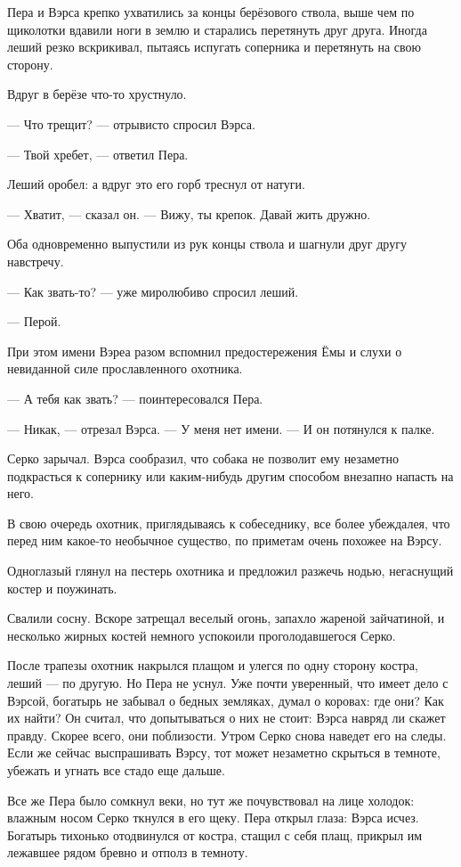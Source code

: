 \documentclass[oneside,final,14pt]{extreport}
\begin{document}
	Пера и Вэрса крепко ухватились за концы берёзового ствола, выше чем по щиколотки вдавили ноги в землю и старались перетянуть друг друга. Иногда леший резко вскрикивал, пытаясь испугать соперника и перетянуть на свою сторону.
	
	Вдруг в берёзе что-то хрустнуло.
	
	— Что трещит? — отрывисто спросил Вэрса.
	
	— Твой хребет, — ответил Пера.
	
	Леший оробел: а вдруг это его горб треснул от натуги.
	
	— Хватит, — сказал он. — Вижу, ты крепок. Давай жить дружно.
	
	Оба одновременно выпустили из рук концы ствола и шагнули друг другу навстречу.
	
	— Как звать-то? — уже миролюбиво спросил леший.
	
	— Перой.
	
	При этом имени Вэреа разом вспомнил предостережения Ёмы и слухи о невиданной силе прославленного охотника.
	
	— А тебя как звать? — поинтересовался Пера.
	
	— Никак, — отрезал Вэрса. — У меня нет имени. — И он потянулся к палке.
	
	Серко зарычал. Вэрса сообразил, что собака не позволит ему незаметно подкрасться к сопернику или каким-нибудь другим способом внезапно напасть на него.
	
	В свою очередь охотник, приглядываясь к собеседнику, все более убеждалея, что перед ним какое-то необычное существо, по приметам очень похожее на Вэрсу.
	
	Одноглазый глянул на пестерь охотника и предложил разжечь нодью, негаснущий костер и поужинать.
	
	Свалили сосну. Вскоре затрещал веселый огонь, запахло жареной зайчатиной, и несколько жирных костей немного успокоили проголодавшегося Серко.
	
	После трапезы охотник накрылся плащом и улегся по одну сторону костра, леший — по другую. Но Пера не уснул. Уже почти уверенный, что имеет дело с Вэрсой, богатырь не забывал о бедных земляках, думал о коровах: где они? Как их найти? Он считал, что допытываться о них не стоит: Вэрса навряд ли скажет правду. Скорее всего, они поблизости. Утром Серко снова наведет его на следы. Если же сейчас выспрашивать Вэрсу, тот может незаметно скрыться в темноте, убежать и угнать все стадо еще дальше.
	
	Все же Пера было сомкнул веки, но тут же почувствовал на лице холодок: влажным носом Серко ткнулся в его щеку. Пера открыл глаза: Вэрса исчез. Богатырь тихонько отодвинулся от костра, стащил с себя плащ, прикрыл им лежавшее рядом бревно и отполз в темноту.
	
\end{document}
